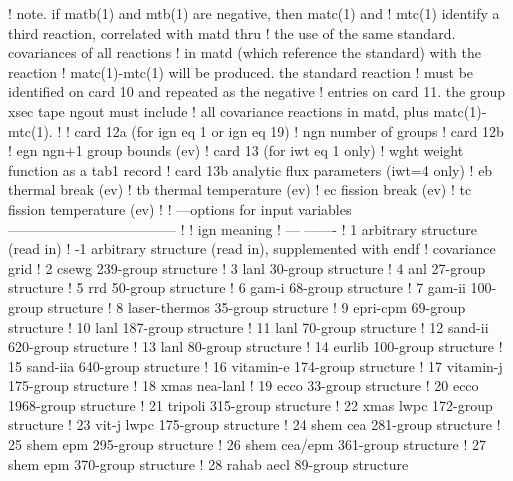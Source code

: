 \begin{ccode}
   !  note.  if matb(1) and mtb(1) are negative, then matc(1) and
   !    mtc(1) identify a third reaction, correlated with matd thru
   !    the use of the same standard.  covariances of all reactions
   !    in matd (which reference the standard) with the reaction
   !    matc(1)-mtc(1) will be produced.  the standard reaction
   !    must be identified on card 10 and repeated as the negative
   !    entries on card 11.  the group xsec tape ngout must include
   !    all covariance reactions in matd, plus matc(1)-mtc(1).
   !
   !  card 12a (for ign eq 1 or ign eq 19)
   !    ngn     number of groups
   !  card 12b
   !    egn     ngn+1 group bounds (ev)
   !  card 13 (for iwt eq 1 only)
   !    wght    weight function as a tab1 record
   !  card 13b  analytic flux parameters (iwt=4 only)
   !    eb      thermal break (ev)
   !    tb      thermal temperature (ev)
   !    ec      fission break (ev)
   !    tc      fission temperature (ev)
   !
   ! ---options for input variables------------------------------------
   !
   !      ign          meaning
   !      ---          -------
   !       1           arbitrary structure (read in)
   !      -1           arbitrary structure (read in), supplemented with endf
   !                   covariance grid
   !       2           csewg 239-group structure
   !       3           lanl 30-group structure
   !       4           anl 27-group structure
   !       5           rrd 50-group structure
   !       6           gam-i 68-group structure
   !       7           gam-ii 100-group structure
   !       8           laser-thermos 35-group structure
   !       9           epri-cpm 69-group structure
   !      10           lanl 187-group structure
   !      11           lanl 70-group structure
   !      12           sand-ii 620-group structure
   !      13           lanl 80-group structure
   !      14           eurlib 100-group structure
   !      15           sand-iia 640-group structure
   !      16           vitamin-e 174-group structure
   !      17           vitamin-j 175-group structure
   !      18           xmas nea-lanl
   !      19           ecco  33-group structure
   !      20           ecco 1968-group structure
   !      21           tripoli 315-group structure
   !      22           xmas lwpc 172-group structure
   !      23           vit-j lwpc 175-group structure
   !      24           shem cea 281-group structure
   !      25           shem epm 295-group structure
   !      26           shem cea/epm 361-group structure
   !      27           shem epm 370-group structure
   !      28           rahab aecl 89-group structure

\end{ccode}
